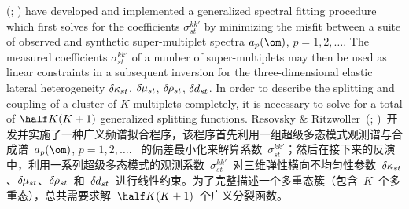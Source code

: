 (\citeyear{resovsky&ritzwoller95}; \citeyear{resovsky&ritzwoller98})
have developed and implemented a generalized spectral fitting procedure which first solves for the coefficients $\sigma_{st}^{kk'}$
by minimizing the misfit between a suite of observed and synthetic
super-multiplet spectra $a_p(\om)$, $p=1,2,\ldots$.  \vspace{-0.5 mm}
The measured coefficients $\sigma^{kk'}_{st}$
of a number of super-multiplets may then be used as linear
constraints in a subsequent inversion
for the three-dimensional elastic lateral heterogeneity
$\delta\hspace{-0.1 mm}\kappa_{st}$, $\delta\hspace{-0.2 mm}\mu_{st}$,
$\delta\hspace{-0.2 mm}\rho_{st}$, $\delta\hspace{-0.1 mm}d_{st}$.
In order to describe the splitting and coupling of a cluster
of $K$ multiplets completely, it is necessary to solve for a
total of $\half K(K+1)$ generalized splitting functions.\vspace{-0.5 mm}
\fi
Resovsky \& Ritzwoller~(\citeyear{resovsky&ritzwoller95}; \citeyear{resovsky&ritzwoller98})~开发并实施了一种广义频谱拟合程序，该程序首先利用一组超级多态模式观测谱与合成谱~$a_p(\om)$, $p=1,2,\ldots$.  \vspace{-0.5 mm}~的偏差最小化来解算系数~$\sigma_{st}^{kk'}$；然后在接下来的反演中，利用一系列超级多态模式的观测系数~$\sigma^{kk'}_{st}$~对三维弹性横向不均匀性参数~$\delta\hspace{-0.1 mm}\kappa_{st}$、$\delta\hspace{-0.2 mm}\mu_{st}$、$\delta\hspace{-0.2 mm}\rho_{st}$~和~$\delta\hspace{-0.1 mm}d_{st}$~进行线性约束。为了完整描述一个多重态簇（包含~$K$~个多重态），总共需要求解~$\half K(K+1)$~个广义分裂函数。

